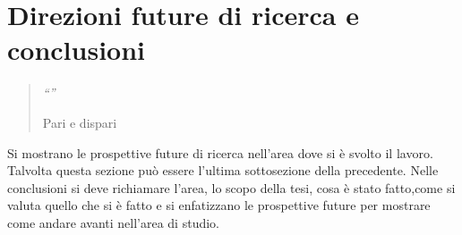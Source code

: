 \chapter{Direzioni future di ricerca e conclusioni}
\label{capitolo7}
\thispagestyle{empty}

\begin{quotation}
{\footnotesize
\noindent\emph{``''}
\begin{flushright}
Pari e dispari
\end{flushright}
}
\end{quotation}
\vspace{0.5cm}

\noindent Si mostrano le prospettive future di ricerca nell'area dove si \`e svolto il lavoro. Talvolta questa sezione pu\`o essere l'ultima sottosezione della precedente. Nelle conclusioni si deve richiamare l'area, lo scopo della tesi, cosa \`e stato fatto,come si valuta quello che si \`e fatto e si enfatizzano le prospettive future per mostrare come andare avanti nell'area di studio.